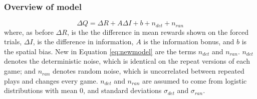 \documentclass[12pt]{article}
\begin{document}
{\subsubsection*{Overview of model}
\begin{equation}
	\label{eq:newmodel}
	\Delta Q= \Delta R+A \Delta I+b+n_{det}+n_{ran}
\end{equation}
where, as before $\Delta R$, is the the difference in mean rewards shown on the forced trials, $\Delta I$, is the difference in information, $A$ is the information bonus, and $b$ is the spatial bias.
New in Equation \ref{eq:newmodel} are the terms $n_{det}$ and $n_{ran}$. $n_{det}$ denotes the deterministic noise, which is identical on the repeat versions of each game; and $n_{ran}$ denotes random noise, which is uncorrelated between repeated plays and changes every game. $n_{det}$ and $n_{ran}$ are assumed to come from logistic distributions with mean 0, and standard deviations $\sigma_{det}$ and $\sigma_{ran}$. 

}
\end{document}
